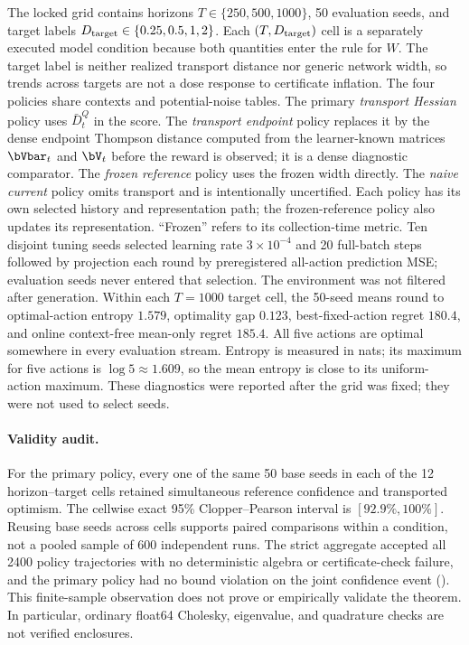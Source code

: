 The locked grid contains horizons $T\in\{250,500,1000\}$, 50 evaluation seeds,
and target labels $D_{\rm target}\in\{0.25,0.5,1,2\}$.  Each $(T,D_{\rm
target})$ cell is a separately executed model condition because both quantities
enter the rule for $W$.  The target label is neither realized transport distance
nor generic network width, so trends across targets are not a dose response to
certificate inflation.  The four policies share contexts and potential-noise tables.
The primary \emph{transport Hessian} policy uses $\bar D_t^Q$ in the score.  The
\emph{transport endpoint} policy replaces it by the dense endpoint Thompson
distance computed from the learner-known matrices $\bVbar_t$ and $\bV_t$ before
the reward is observed; it is a dense diagnostic comparator.  The \emph{frozen
reference} policy uses the frozen width directly.  The \emph{naive current}
policy omits transport and is intentionally uncertified.  Each policy has its
own selected history and representation path; the frozen-reference policy also
updates its representation.  ``Frozen'' refers to its collection-time metric.
Ten disjoint tuning seeds
selected learning rate $3\times10^{-4}$ and 20 full-batch steps followed by
projection each round by preregistered all-action prediction MSE; evaluation
seeds never entered that selection.
The environment was not filtered after generation.  Within each $T=1000$
target cell, the 50-seed means round to optimal-action entropy $1.579$, optimality
gap $0.123$, best-fixed-action regret $180.4$, and online context-free
mean-only regret $185.4$.  All five actions are optimal somewhere in every
evaluation stream.  Entropy is measured in nats; its maximum for five actions
is $\log 5\approx1.609$, so the mean entropy is close to its uniform-action
maximum.  These diagnostics were reported after the grid was fixed;
they were not used to select seeds.

\paragraph{Validity audit.}
For the primary policy, every one of the same 50 base seeds in each of the 12
horizon--target cells retained simultaneous reference confidence and
transported optimism.  The cellwise exact 95\% Clopper--Pearson interval is
$[92.9\%,100\%]$.  Reusing base seeds across cells supports paired comparisons
within a condition, not a pooled sample of 600 independent runs.  The strict aggregate accepted all 2400 policy
trajectories with no deterministic algebra or certificate-check failure, and
the primary policy had no bound violation on the joint confidence event
().  This finite-sample observation
does not prove or empirically validate the theorem.  In particular, ordinary
float64 Cholesky, eigenvalue, and quadrature checks are not verified
enclosures.

